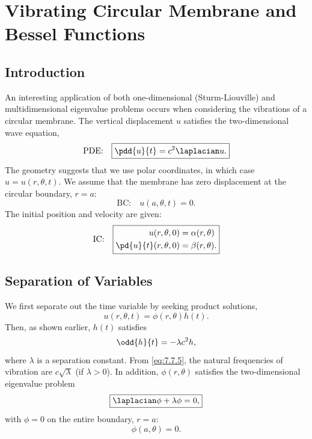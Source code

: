 \section{Vibrating Circular Membrane and Bessel Functions}
\label{sec:7.7}

\subsection{Introduction}
\label{sec:7.7.1}

An interesting application of both one-dimensional (Sturm-Liouville) and multidimensional eigenvalue problems occurs when considering the vibrations of a circular membrane.  The vertical displacement $u$ satisfies the two-dimensional wave equation,
\begin{equation}
\text{PDE:}\quad
\boxed{\pdd{u}{t} = c^2\laplacian u.}
\label{eq:7.7.1}
\end{equation}
The geometry suggests that we use polar coordinates, in which case $u = u(r,\theta,t)$.  We assume that the membrane has zero displacement at the circular boundary, $r = a$:
\begin{equation}
\text{BC:}\quad
\boxed{u(a,\theta,t) = 0.}
\label{eq:7.7.2}
\end{equation}
The initial position and velocity are given:
\begin{equation}
\text{IC:}\quad
\boxed{\begin{aligned}
u(r,\theta,0) &= \alpha(r,\theta) \\
\pd{u}{t}(r,\theta,0) &= \beta(r,\theta).
\end{aligned}}
\label{eq:7.7.3}
\end{equation}

\subsection{Separation of Variables}
\label{sec:7.7.2}

We first separate out the time variable by seeking product solutions,
\begin{equation}
u(r,\theta,t) = \phi(r,\theta)h(t).
\label{eq:7.7.4}
\end{equation}
Then, as shown earlier, $h(t)$ satisfies
\begin{equation}
\odd{h}{t} = -\lambda c^2 h,
\label{eq:7.7.5}
\end{equation}
where $\lambda$ is a separation constant.  From \eqref{eq:7.7.5}, the natural frequencies of vibration are $c\sqrt{\lambda}$ (if $\lambda > 0$).  In addition, $\phi(r,\theta)$ satisfies the two-dimensional eigenvalue problem
\begin{equation}
\boxed{\laplacian\phi + \lambda\phi = 0,}
\label{eq:7.7.6}
\end{equation}
with $\phi = 0$ on the entire boundary, $r = a$:
\begin{equation}
\phi(a,\theta) = 0.
\label{eq:7.7.7}
\end{equation}

